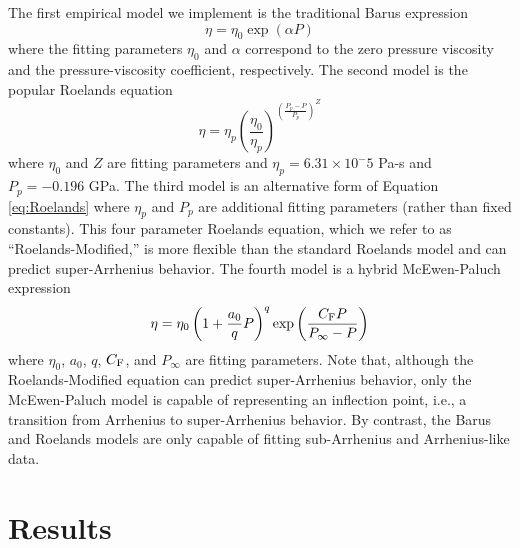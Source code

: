 \documentclass[preprint,review,12pt]{elsarticle}
\begin{document}
           
    The first empirical model we implement is the traditional Barus expression \cite{Barus1893}
	\begin{equation} \label{eq:Barus}
	\eta = \eta_0 \exp(\alpha P)
	\end{equation}
	where the fitting parameters $\eta_0$ and $\alpha$ correspond to the zero pressure viscosity and the pressure-viscosity coefficient, respectively. The second model is the popular Roelands equation \cite{Roelands1966}	
	\begin{equation} \label{eq:Roelands}
	\eta = \eta_p \left(\frac{\eta_0}{\eta_p}\right)^{\left(\frac{P_p - P}{P_p}\right)^Z}
	\end{equation}
	where $\eta_0$ and $Z$ are fitting parameters and $\eta_p = 6.31 \times 10^-5$ Pa-s and $P_p = -0.196$ GPa. The third model is an alternative form of Equation \ref{eq:Roelands} where $\eta_p$ and $P_p$ are additional fitting parameters (rather than fixed constants). This four parameter Roelands equation, which we refer to as ``Roelands-Modified,'' is more flexible than the standard Roelands model and can predict super-Arrhenius behavior. The fourth model is a hybrid McEwen-Paluch expression \cite{Bair2016}	
	\begin{equation} \label{eq:McEwen-Paluch}
	\eta = \eta_0 \left(1 + \frac{a_0}{q} P\right)^q \exp\left(\frac{C_{\rm F} P}{P_\infty - P}\right)
	\end{equation}
	where $\eta_0$, $a_0$, $q$, $C_{\rm F}$, and $P_\infty$ are fitting parameters.  Note that, although the Roelands-Modified equation can predict super-Arrhenius behavior, only the McEwen-Paluch model is capable of representing an inflection point, i.e., a transition from Arrhenius to super-Arrhenius behavior. By contrast, the Barus and Roelands models are only capable of fitting sub-Arrhenius and Arrhenius-like data.
	
		
	\section{Results} \label{Results}    
	
\end{document}

